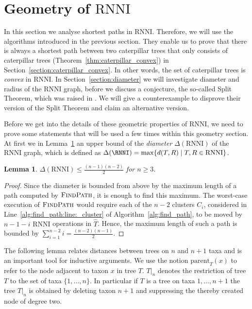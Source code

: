 \documentclass{amsart}
\newcommand{\parent}{\mathrm{parent}}
\newcommand{\rnni}{\mathrm{RNNI}}
\newcommand{\findpath}{\textsc{FindPath}}
\newtheorem{lemma}[definition]{Lemma}
\begin{document}
\section{Geometry of $\rnni$}
\label{section:geometry}

In this section we analyse shortest paths in $\rnni$.
Therefore, we will use the algorithms introduced in the previous section.
They enable us to prove that there is always a shortest path between two caterpillar trees that only consists of caterpillar trees (Theorem~\ref{thm:caterpillar_convex}) in Section~\ref{section:caterpillar_convex}.
In other words, the set of caterpillar trees is \emph{convex} in $\rnni$.
In Section~\ref{section:diameter} we will investigate diameter and radius of the $\rnni$ graph, before we discuss a conjecture, the so-called Split Theorem, which was raised in \autocite{Gavryushkin2018-ol}.
We will give a counterexample to disprove their version of the Split Theorem and claim an alternative version.

Before we get into the details of these geometric properties of $\rnni$, we need to prove some statements that will be used a few times within this geometry section.
At first we in Lemma~\ref{lemma:diameter_bound} an upper bound of the \emph{diameter} $\Delta(\rnni)$ of the $\rnni$ graph, which is defined as $\Delta(\RNNI) = \max \{d(T, R) \mid T, R \in \rnni\}$.

\begin{lemma}
$\Delta(\rnni) \leq \frac{(n-1)(n-2)}{2}$ for $n \geq 3$.
\label{lemma:diameter_bound}
\end{lemma}

\begin{proof}
Since the diameter is bounded from above by the maximum length of a path computed by $\findpath$, it is enough to find this maximum.
The worst-case execution of $\findpath$ would require each of the $n-2$ clusters $C_i$, considered in Line~\ref{alg:find_path:line:_cluster} of Algorithm~\ref{alg:find_path}, to be moved by $n-1-i$ $\rnni$ operations in $\hat{T}$.
Hence, the maximum length of such a path is bounded by $\sum\limits_{i = 1}^{n-2} i = \frac{(n-2)(n-1)}{2}$.
\end{proof}

The following lemma relates distances between trees on $n$ and $n+1$ taxa and is an important tool for inductive arguments.
We use the notion $\parent_T(x)$ to refer to the node adjacent to taxon $x$ in tree $T$.
$T{\big|}_n$ denotes the restriction of tree $T$ to the set of taxa $\{1, \ldots, n\}$.
In particular if $T$ is a tree on taxa $1, \ldots, n+1$ the tree $T{\big|}_n$ is obtained by deleting taxon $n+1$ and suppressing the thereby created node of degree two.
\end{document}
